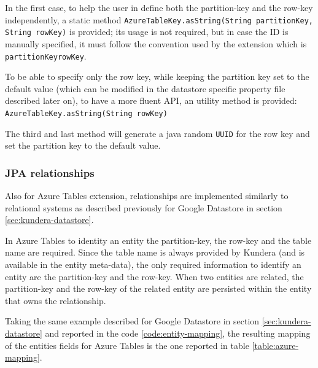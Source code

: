 \noindent In the first case, to help the user in define both the partition-key and the row-key independently, a static method \texttt{AzureTableKey.asString(String partitionKey, String rowKey)} is provided; its usage is not required, but in case the ID is manually specified, it must follow the convention used by the extension which is \texttt{partitionKey\textunderscore rowKey}.

\noindent To be able to specify only the row key, while keeping the partition key set to the default value (which can be modified in the datastore specific property file described later on), to have a more fluent API, an utility method is provided: \texttt{AzureTableKey.asString(String rowKey)} 

\noindent The third and last method will generate a java random \texttt{UUID} for the row key and set the partition key to the default value.

\subsubsection{JPA relationships}
Also for Azure Tables extension, relationships are implemented similarly to relational systems as described previously for Google Datastore in section \ref{sec:kundera-datastore}.

\noindent In Azure Tables to identity an entity the partition-key, the row-key and the table name are required. Since the table name is always provided by Kundera (and is available in the entity meta-data), the only required information to identify an entity are the partition-key and the row-key.
When two entities are related, the partition-key and the row-key of the related entity are persisted within the entity that owns the relationship.


\newparagraph Taking the same example described for Google Datastore in section \ref{sec:kundera-datastore} and reported in the code \ref{code:entity-mapping}, the resulting mapping of the entities fields for Azure Tables is the one reported in table \ref{table:azure-mapping}.

\begin{table}[ht]
\vspace{1em}
\small
\centering
{}
\\
\caption{Mapping of entity fields on Azure Tables}
\label{table:azure-mapping}
\end{table}

